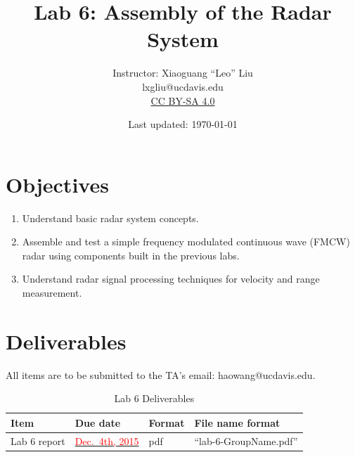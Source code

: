 \documentclass[letterpaper, 11pt]{article}
\newcommand{\due}[1]{\href{https://github.com/ucdart/UCD-EEC134/blob/master/support/schedule/eec134-schedule.pdf}{\textcolor{red}{#1}}}
\begin{document}
\title{Lab 6: Assembly of the Radar System}
\author{Instructor: Xiaoguang ``Leo'' Liu\\lxgliu@ucdavis.edu \\
	\small \href{http://creativecommons.org/licenses/by-sa/4.0/}{CC BY-SA 4.0}}
\date{Last updated: \today}

\maketitle


\section{Objectives}

\begin{enumerate}[itemsep=0.1ex]
	\item Understand basic radar system concepts. 
	
	\item Assemble and test a simple frequency modulated continuous wave (FMCW) radar using components built in the previous labs. 
	
	\item Understand radar signal processing techniques for velocity and range measurement. 
\end{enumerate}

\section{Deliverables}
All items are to be submitted to the TA's email: haowang@ucdavis.edu.  

\vspace{0.5cm}

\begin{table}[h]
	\footnotesize
	\caption{Lab 6 Deliverables}
	\renewcommand{\arraystretch}{1.2}
	\begin{tabular}{|m{1in}|l|m{0.45in}|m{2in}|}
		\hline
		\textbf{Item} & \textbf{Due date} & \textbf{Format} & \textbf{File name format} \\
		\hline
		\hline
		Lab 6 report & \due{Dec.~4th, 2015} & pdf & ``lab-6-GroupName.pdf''\\
		\hline
	\end{tabular}
	\label{tab:deliverables}
\end{table}
\end{document}
